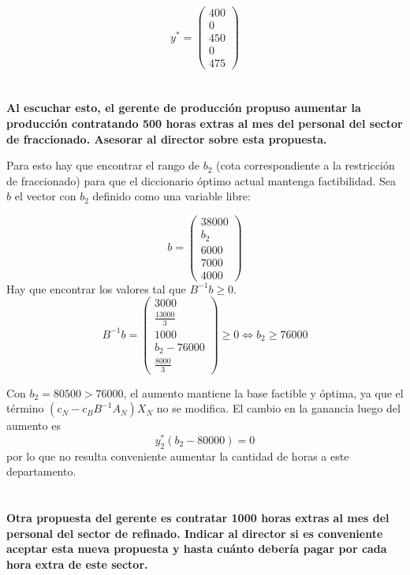 \documentclass[10pt,a4paper]{article}
\begin{document}
	$$
	y^* = \begin{pmatrix}
		400 \\
		0 \\
		450 \\
		0 \\
		475
	\end{pmatrix}
	$$
	
	\section{} %
	\textbf{Al escuchar esto, el gerente de producción propuso aumentar la producción contratando 500 horas extras al mes del personal del sector de fraccionado. Asesorar al director sobre esta propuesta.}
	
	\vspace{5mm}
	
	Para esto hay que encontrar el rango de $b_2$ (cota correspondiente a la restricción de fraccionado) para que el diccionario óptimo actual mantenga factibilidad. Sea $b$ el vector con $b_2$ definido como una variable libre:
	
	$$
	b = \begin{pmatrix}
		38000 \\
		b_2 \\
		6000 \\
		7000 \\
		4000
	\end{pmatrix}
	$$
	Hay que encontrar los valores tal que $B^{-1}b \geq 0$.
	$$
	B^{-1}b = \begin{pmatrix}
		3000 \\
		\frac{13000}{3} \\
		1000 \\
		b_2 - 76000 \\
		\frac{8000}{3}
	\end{pmatrix}  \geq 0 \iff b_2 \geq 76000
	$$
	
	Con $b_2 = 80500 > 76000$, el aumento mantiene la base factible y óptima, ya que el término $(c_N - c_B B^{-1} A_N) X_N$ no se modifica. El cambio en la ganancia luego del aumento es
	$$y^*_2(b_2 - 80000) = 0$$ por lo que no resulta conveniente aumentar la cantidad de horas a este departamento.
	
	\section{} %
	\textbf{Otra propuesta del gerente es contratar 1000 horas extras al mes del personal del sector de refinado. Indicar al director si es conveniente aceptar esta nueva propuesta y hasta cuánto debería pagar por cada hora extra de este sector.}
	
\end{document}
